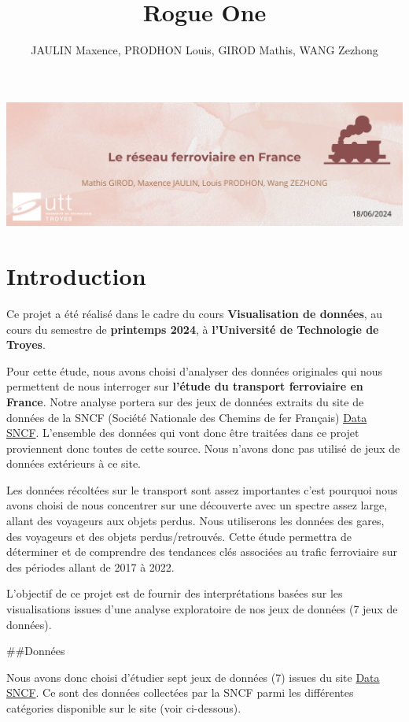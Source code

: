 \documentclass[
]{article}
\title{Rogue One}
\author{JAULIN Maxence, PRODHON Louis, GIROD Mathis, WANG Zezhong}
\date{}
\begin{document}
\maketitle

\includegraphics{images/entete-rapportIF36.png}

\hypertarget{introduction}{%
\section{Introduction}\label{introduction}}

Ce projet a été réalisé dans le cadre du cours \textbf{Visualisation de
données}, au cours du semestre de \textbf{printemps 2024}, à
\textbf{l'Université de Technologie de Troyes}.

Pour cette étude, nous avons choisi d'analyser des données originales
qui nous permettent de nous interroger sur \textbf{l'étude du transport
ferroviaire en France}. Notre analyse portera sur des jeux de données
extraits du site de données de la SNCF (Société Nationale des Chemins de
fer Français) \href{https://data.sncf.com}{Data SNCF}. L'ensemble des
données qui vont donc être traitées dans ce projet proviennent donc
toutes de cette source. Nous n'avons donc pas utilisé de jeux de données
extérieurs à ce site.

Les données récoltées sur le transport sont assez importantes c'est
pourquoi nous avons choisi de nous concentrer sur une découverte avec un
spectre assez large, allant des voyageurs aux objets perdus. Nous
utiliserons les données des gares, des voyageurs et des objets
perdus/retrouvés. Cette étude permettra de déterminer et de comprendre
des tendances clés associées au trafic ferroviaire sur des périodes
allant de 2017 à 2022.

L'objectif de ce projet est de fournir des interprétations basées sur
les visualisations issues d'une analyse exploratoire de nos jeux de
données (7 jeux de données).

\#\#Données

Nous avons donc choisi d'étudier sept jeux de données (7) issues du site
\href{https://data.sncf.com}{Data SNCF}. Ce sont des données collectées
par la SNCF parmi les différentes catégories disponible sur le site
(voir ci-dessous).
\end{document}
